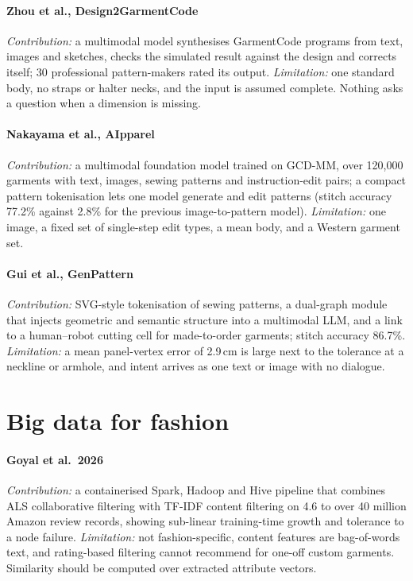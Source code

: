\paragraph{Zhou et al., Design2GarmentCode \cite{zhou2025d2gc}} \emph{Contribution:} a multimodal model synthesises GarmentCode programs from text, images and sketches, checks the simulated result against the design and corrects itself; 30 professional pattern-makers rated its output. \emph{Limitation:} one standard body, no straps or halter necks, and the input is assumed complete. Nothing asks a question when a dimension is missing.

\paragraph{Nakayama et al., AIpparel \cite{nakayama2025aipparel}} \emph{Contribution:} a multimodal foundation model trained on GCD-MM, over 120,000 garments with text, images, sewing patterns and instruction-edit pairs; a compact pattern tokenisation lets one model generate and edit patterns (stitch accuracy 77.2\% against 2.8\% for the previous image-to-pattern model). \emph{Limitation:} one image, a fixed set of single-step edit types, a mean body, and a Western garment set.

\paragraph{Gui et al., GenPattern \cite{gui2025genpattern}} \emph{Contribution:} SVG-style tokenisation of sewing patterns, a dual-graph module that injects geometric and semantic structure into a multimodal LLM, and a link to a human--robot cutting cell for made-to-order garments; stitch accuracy 86.7\%. \emph{Limitation:} a mean panel-vertex error of 2.9\,cm is large next to the tolerance at a neckline or armhole, and intent arrives as one text or image with no dialogue.

\section{Big data for fashion}

\paragraph{Goyal et al.\ 2026 \cite{goyal2026hybrid}} \emph{Contribution:} a containerised Spark, Hadoop and Hive pipeline that combines ALS collaborative filtering with TF-IDF content filtering on 4.6 to over 40 million Amazon review records, showing sub-linear training-time growth and tolerance to a node failure. \emph{Limitation:} not fashion-specific, content features are bag-of-words text, and rating-based filtering cannot recommend for one-off custom garments. Similarity should be computed over extracted attribute vectors.

